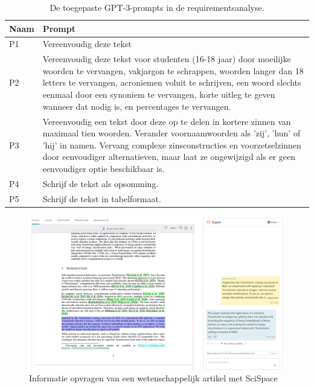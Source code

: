 \begin{center}
	\begin{table}[H]
		\begin{tabular}{ | m{2cm} | m{14cm} | } 
			\hline
			\textbf{Naam} & \textbf{Prompt} \\
			\hline
			P1 & Vereenvoudig deze tekst \\
			\hline
			P2 & Vereenvoudig deze tekst voor studenten (16-18 jaar) door moeilijke woorden te vervangen, vakjargon te schrappen, woorden langer dan 18 letters te vervangen, acroniemen voluit te schrijven, een woord slechts eenmaal door een synoniem te vervangen, korte uitleg te geven wanneer dat nodig is, en percentages te vervangen. \\
			\hline
			P3 & Vereenvoudig een tekst door deze op te delen in kortere zinnen van maximaal tien woorden. Verander voornaamwoorden als 'zij', 'hun' of 'hij' in namen. Vervang complexe zinsconstructies en voorzetselzinnen door eenvoudiger alternatieven, maar laat ze ongewijzigd als er geen eenvoudiger optie beschikbaar is. \\
			\hline
			P4 & Schrijf de tekst als opsomming. \\
			\hline
			P5 & Schrijf de tekst in tabelformaat. \\
			\hline
		\end{tabular}
		\caption{De toegepaste GPT-3-prompts in de requirementsanalyse.}
		\label{table:tested-prompts-requirementsanalysis}
	\end{table}
\end{center}

\begin{figure}[H]
	\includegraphics{img/typeset-example.png}
	\caption{Informatie opvragen van een wetenschappelijk artikel met SciSpace}
	\label{img:scispace-example}
\end{figure}

